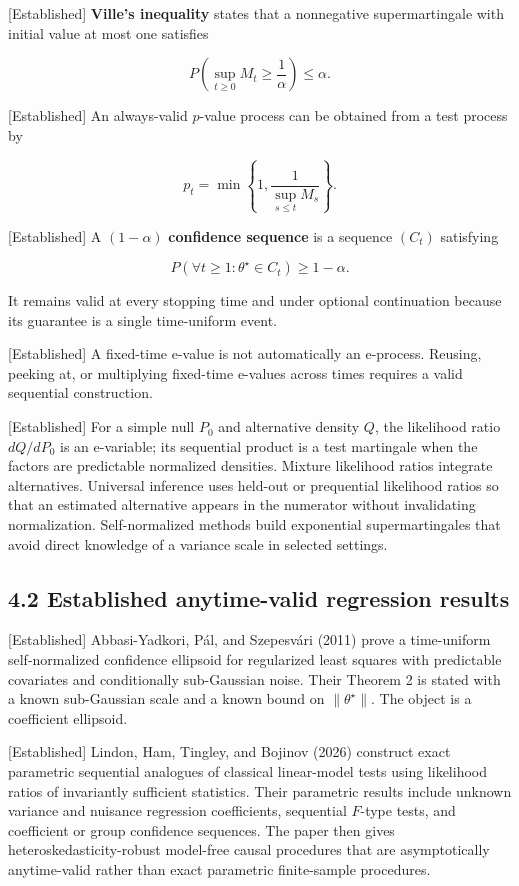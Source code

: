 \documentclass[
  english,
  11pt,
  a4paper,
]{article}
\begin{document}
{[}Established{]} \textbf{Ville's inequality} states that a nonnegative
supermartingale with initial value at most one satisfies

$$
P\!\left(\sup_{t\ge0}M_t\ge\frac1\alpha\right)\le\alpha.
$$

{[}Established{]} An always-valid $p$-value process can be obtained
from a test process by

$$
p_t=\min\left\{1,\frac{1}{\sup_{s\le t}M_s}\right\}.
$$

{[}Established{]} A $(1-\alpha)$ \textbf{confidence sequence} is a
sequence $(C_t)$ satisfying

$$
P(\forall t\ge1:\theta^\star\in C_t)\ge1-\alpha.
$$

It remains valid at every stopping time and under optional continuation
because its guarantee is a single time-uniform event.

{[}Established{]} A fixed-time e-value is not automatically an
e-process. Reusing, peeking at, or multiplying fixed-time e-values
across times requires a valid sequential construction.

{[}Established{]} For a simple null $P_0$ and alternative density
$Q$, the likelihood ratio $dQ/dP_0$ is an e-variable; its sequential
product is a test martingale when the factors are predictable normalized
densities. Mixture likelihood ratios integrate alternatives. Universal
inference uses held-out or prequential likelihood ratios so that an
estimated alternative appears in the numerator without invalidating
normalization. Self-normalized methods build exponential
supermartingales that avoid direct knowledge of a variance scale in
selected settings.

\subsection{4.2 Established anytime-valid regression
results}\label{established-anytime-valid-regression-results}

{[}Established{]} Abbasi-Yadkori, Pál, and Szepesvári (2011) prove a
time-uniform self-normalized confidence ellipsoid for regularized least
squares with predictable covariates and conditionally sub-Gaussian
noise. Their Theorem 2 is stated with a known sub-Gaussian scale and a
known bound on $\lVert\theta^\star\rVert$. The object is a coefficient
ellipsoid.

{[}Established{]} Lindon, Ham, Tingley, and Bojinov (2026) construct
exact parametric sequential analogues of classical linear-model tests
using likelihood ratios of invariantly sufficient statistics. Their
parametric results include unknown variance and nuisance regression
coefficients, sequential $F$-type tests, and coefficient or group
confidence sequences. The paper then gives heteroskedasticity-robust
model-free causal procedures that are asymptotically anytime-valid
rather than exact parametric finite-sample procedures.
\end{document}
